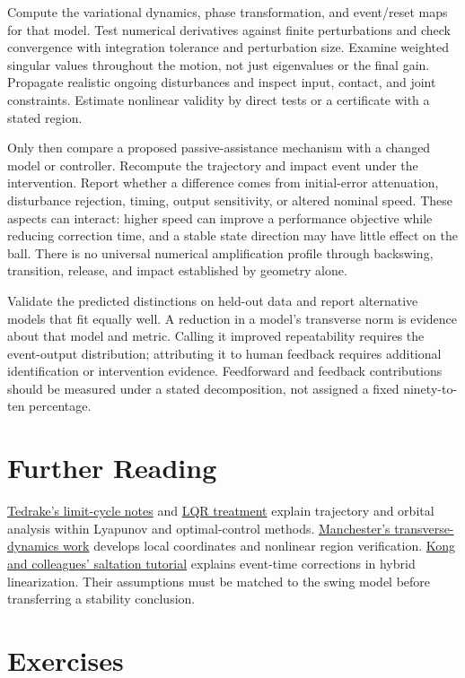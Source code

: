 Compute the variational dynamics, phase transformation, and event/reset maps
for that model. Test numerical derivatives against finite perturbations and
check convergence with integration tolerance and perturbation size. Examine
weighted singular values throughout the motion, not just eigenvalues or the
final gain. Propagate realistic ongoing disturbances and inspect input,
contact, and joint constraints. Estimate nonlinear validity by direct tests
or a certificate with a stated region.

Only then compare a proposed passive-assistance mechanism with a changed
model or controller. Recompute the trajectory and impact event under the
intervention. Report whether a difference comes from initial-error attenuation,
disturbance rejection, timing, output sensitivity, or altered nominal speed.
These aspects can interact: higher speed can improve a performance objective
while reducing correction time, and a stable state direction may have little
effect on the ball. There is no universal numerical amplification profile
through backswing, transition, release, and impact established by geometry alone.

Validate the predicted distinctions on held-out data and report alternative
models that fit equally well. A reduction in a model's transverse norm is
evidence about that model and metric. Calling it improved repeatability requires
the event-output distribution; attributing it to human feedback requires
additional identification or intervention evidence. Feedforward and feedback
contributions should be measured under a stated decomposition, not assigned
a fixed ninety-to-ten percentage.

\section{Further Reading}

\href{https://underactuated.mit.edu/limit_cycles.html}{Tedrake's limit-cycle
notes} and \href{https://underactuated.mit.edu/lqr.html}{LQR treatment} explain
trajectory and orbital analysis within Lyapunov and optimal-control methods.
\href{https://arxiv.org/abs/1010.2241}{Manchester's transverse-dynamics work}
develops local coordinates and nonlinear region verification.
\href{https://arxiv.org/abs/2306.06862}{Kong and colleagues' saltation tutorial}
explains event-time corrections in hybrid linearization. Their assumptions
must be matched to the swing model before transferring a stability conclusion.

\section{Exercises}

